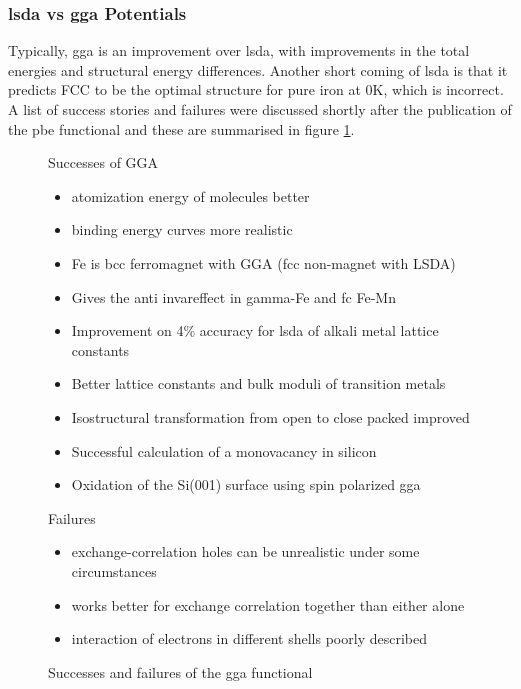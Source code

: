 \subsubsection{\acrshort{lsda} vs \acrshort{gga} Potentials}
\label{section:ggavslsda}

Typically, \acrshort{gga} is an improvement over \acrshort{lsda}, with improvements in the total energies and structural energy differences\cite{perdewggamadesimple}.  Another short coming of \acrshort{lsda} is that it predicts FCC to be the optimal structure for pure iron at 0K, which is incorrect\cite{perdewggabackwardforward}.  A list of success stories and failures were discussed shortly after the publication of the \acrshort{pbe} functional and these are summarised in figure \ref{fig:pbesuccessfailure}\cite{ldaggaperdew}.

\begin{figure}
\begin{minipage}[t]{.42\textwidth}
Successes of GGA
\begin{itemize}
\item atomization energy of molecules better
\item binding energy curves more realistic
\item Fe is bcc ferromagnet with GGA (fcc non-magnet with LSDA)
\item Gives the anti \gls{invareffect} in gamma-Fe and fc Fe-Mn 
\item Improvement on 4\% accuracy for \acrshort{lsda} of alkali metal lattice constants
\item Better lattice constants and bulk moduli of transition metals
\item Isostructural transformation from open to close packed improved
\item Successful calculation of a monovacancy in silicon
\item Oxidation of the Si(001) surface using spin polarized \acrshort{gga}
\end{itemize}
\end{minipage}
\begin{minipage}{.15\textwidth}
\end{minipage}
\begin{minipage}[t]{.42\textwidth}
Failures
\begin{itemize}
\item exchange-correlation holes can be unrealistic under some circumstances
\item works better for exchange correlation together than either alone
\item interaction of electrons in different shells poorly described
\end{itemize}
\end{minipage}
\caption{Successes and failures of the \acrshort{gga} functional\cite{ldaggaperdew}}
\label{fig:pbesuccessfailure}
\end{figure}

